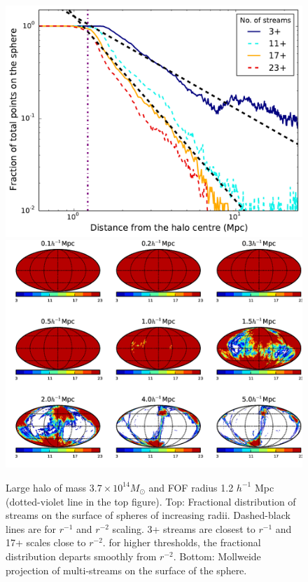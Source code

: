 \begin{figure}
\begin{minipage}[t]{.99\linewidth}
  \centering\includegraphics[width=10.cm]{Chapter3/Source_v2/fig7a}
\includegraphics[width=10.cm]{Chapter3/Source_v2/fig7b} 
\end{minipage}\hfill
\caption{ Large halo of mass $3.7 \times 10^{14}M_{\odot} $  and FOF radius 1.2 $h^{-1}$ Mpc (dotted-violet line in the top figure). Top: Fractional distribution of streams on the surface of spheres of increasing radii. Dashed-black lines are for $r^{-1}$ and $r^{-2}$ scaling. 3+ streams are closest to $r^{-1}$ and 17+ scales close to $r^{-2}$. for higher thresholds, the fractional distribution departs smoothly from $r^{-2}$. Bottom: Mollweide projection of multi-streams on the surface of the sphere.}
\label{fig:3}
\end{figure}

